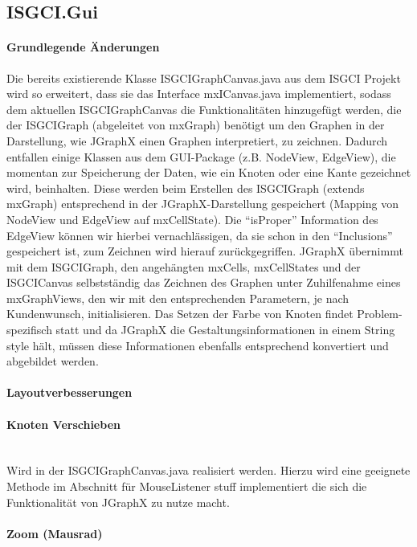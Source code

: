 \documentclass[10pt,a4paper]{article}
\begin{document}
\subsection{ISGCI.Gui}
\paragraph{Grundlegende Änderungen}
Die bereits existierende Klasse ISGCIGraphCanvas.java aus dem ISGCI Projekt wird so erweitert, dass sie das Interface mxICanvas.java implementiert, sodass dem aktuellen ISGCIGraphCanvas die Funktionalitäten hinzugefügt werden, die der ISGCIGraph (abgeleitet von mxGraph) benötigt um den Graphen in der Darstellung, wie JGraphX einen Graphen interpretiert, zu zeichnen. 
Dadurch entfallen einige Klassen aus dem GUI-Package (z.B. NodeView, EdgeView), die momentan zur Speicherung der Daten, wie ein Knoten oder eine Kante gezeichnet wird, beinhalten. Diese werden beim Erstellen des ISGCIGraph (extends mxGraph) entsprechend in der JGraphX-Darstellung gespeichert (Mapping von NodeView und EdgeView auf mxCellState). Die "`isProper"' Information des EdgeView können wir hierbei vernachlässigen, da sie schon in den "`Inclusions"' gespeichert ist, zum Zeichnen wird hierauf zurückgegriffen. 
JGraphX übernimmt mit dem ISGCIGraph, den angehängten mxCells, mxCellStates und der ISGCICanvas selbstständig das Zeichnen des Graphen unter Zuhilfenahme eines mxGraphViews, den wir mit den entsprechenden Parametern, je nach Kundenwunsch, initialisieren. 
Das Setzen der Farbe von Knoten findet Problem-spezifisch statt und da JGraphX die Gestaltungsinformationen in einem String style hält, müssen diese Informationen ebenfalls entsprechend konvertiert und abgebildet werden.
\paragraph{Layoutverbesserungen}

\paragraph{Knoten Verschieben}\ \\ 

Wird in der ISGCIGraphCanvas.java realisiert werden. Hierzu wird eine geeignete Methode im Abschnitt für MouseListener stuff implementiert die sich die Funktionalität von JGraphX zu nutze macht.

\paragraph{Zoom (Mausrad)}\ \\ 
\end{document}
